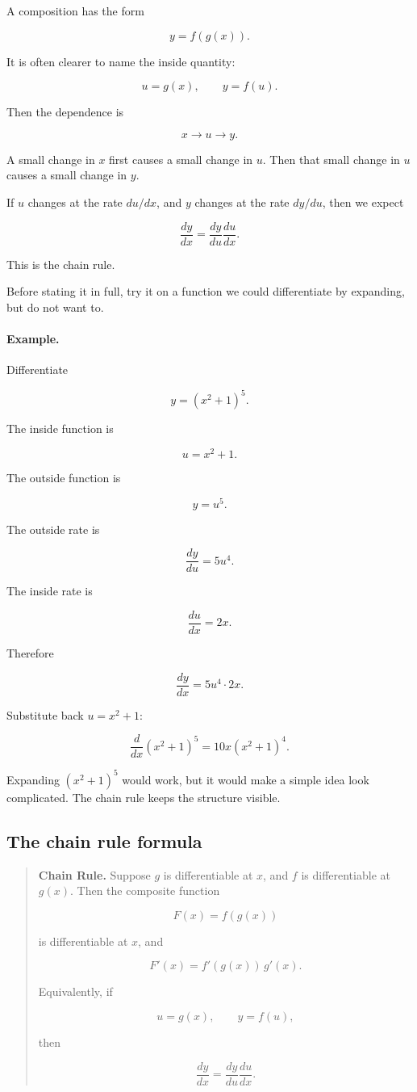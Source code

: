 A composition has the form

\[
y=f(g(x)).
\]

It is often clearer to name the inside quantity:

\[
u=g(x),
\qquad
y=f(u).
\]

Then the dependence is

\[
x \longrightarrow u \longrightarrow y.
\]

A small change in \(x\) first causes a small change in \(u\).  Then that small change in \(u\) causes a small change in \(y\).

If \(u\) changes at the rate \(du/dx\), and \(y\) changes at the rate \(dy/du\), then we expect

\[
\frac{dy}{dx}
=
\frac{dy}{du}\frac{du}{dx}.
\]

This is the chain rule.

Before stating it in full, try it on a function we could differentiate by expanding, but do not want to.

\paragraph{Example.}
Differentiate

\[
y=(x^2+1)^5.
\]

The inside function is

\[
u=x^2+1.
\]

The outside function is

\[
y=u^5.
\]

The outside rate is

\[
\frac{dy}{du}=5u^4.
\]

The inside rate is

\[
\frac{du}{dx}=2x.
\]

Therefore

\[
\frac{dy}{dx}
=
5u^4\cdot 2x.
\]

Substitute back \(u=x^2+1\):

\[
\boxed{
\frac{d}{dx}(x^2+1)^5
=
10x(x^2+1)^4.
}
\]

Expanding \((x^2+1)^5\) would work, but it would make a simple idea look complicated.  The chain rule keeps the structure visible.

\subsection{The chain rule formula}
\label{subsec:chain-rule-formula}

\begin{quote}
\textbf{Chain Rule.}
Suppose \(g\) is differentiable at \(x\), and \(f\) is differentiable at \(g(x)\).  Then the composite function

\[
F(x)=f(g(x))
\]

is differentiable at \(x\), and

\[
\boxed{
F'(x)=f'(g(x))\,g'(x).
}
\]

Equivalently, if

\[
u=g(x),
\qquad
y=f(u),
\]

then

\[
\boxed{
\frac{dy}{dx}
=
\frac{dy}{du}\frac{du}{dx}.
}
\]
\end{quote}

